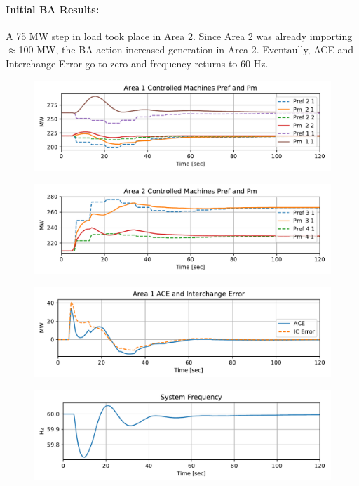 \documentclass[12pt]{article}
\begin{document}
\pagebreak
\paragraph{Initial BA Results:} A 75 MW step in load took place in Area 2. Since Area 2 was already importing $\approx$100 MW, the BA action increased generation in Area 2. Eventaully, ACE and Interchange Error go to zero and frequency returns to 60 Hz.
\begin{figure}[h!]
		\centering
		\includegraphics[width=\linewidth]{area1}\vspace{-1em}
\end{figure}\vspace{-2em}
\begin{figure}[h!]
		\centering
		\includegraphics[width=\linewidth]{area2}\vspace{-1em}
\end{figure}\vspace{-2em}
\begin{figure}[h!]
		\centering
		\includegraphics[width=\linewidth]{ACE}\vspace{-1em}
\end{figure}\vspace{-2em}
\begin{figure}[h!]
		\centering
		\includegraphics[width=\linewidth]{freq}\vspace{-1em}
\end{figure}\vspace{-2.5em}
\end{document}
